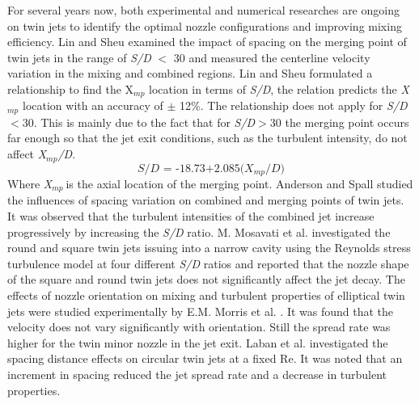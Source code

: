 \documentclass[Afour,sagev,times]{sagej}
\begin{document}
For several years now, both experimental and numerical researches are ongoing on twin jets to identify the optimal nozzle configurations and improving mixing efficiency. Lin and Sheu \cite{lin1990investigation} examined the impact of spacing on the merging point of twin jets in the range of \textit{S/D} $\mathrm{<}$ 30 and measured the centerline velocity variation in the mixing and combined regions. Lin and Sheu \cite{lin1990investigation} formulated a relationship to find the X${}_{mp}$ location in terms of \textit{S/D}, the relation predicts the \textit{X${}_{mp}$} location with an accuracy of $\mathrm{\pm}$ 12\%. The relationship does not apply for \textit{S/D}$\mathrm{<}$30. This is mainly due to the fact that for \textit{S/D}$\mathrm{>}$30 the merging point occurs far enough so that the jet exit conditions, such as the turbulent intensity, do not affect \textit{X${}_{mp}$/D}.
\begin{equation}\label{eq1}
\textit{S/D = -18.73+2.085(X${}_{mp}$/D)}
\end{equation} 
Where \textit{X${}_{mp}$}${}_{\ }$is the axial location of the merging point.
Anderson and Spall \cite{anderson2001experimental} studied the influences of spacing variation on combined and merging points of twin jets. It was observed that the turbulent intensities of the combined jet increase progressively by increasing the \textit{S/D} ratio. M. Mosavati et al. \cite{mosavati2021characteristics} investigated the round and square twin jets issuing into a narrow cavity using the Reynolds stress turbulence model at four different \textit{S/D} ratios and reported that the nozzle shape of the square and round twin jets does not significantly affect the jet decay. The effects of nozzle orientation on mixing and turbulent properties of elliptical twin jets were studied experimentally by E.M. Morris et al. \cite{morris2021particle}. It was found that the velocity does not vary significantly with orientation. Still the spread rate was higher for the twin minor nozzle in the jet exit. Laban et al. \cite{laban2019experimental} investigated the spacing distance effects on circular twin jets at a fixed Re. It was noted that an increment in spacing reduced the jet spread rate and a decrease in turbulent properties.  
\end{document}
